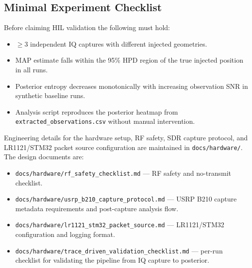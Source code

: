 \subsection{Minimal Experiment Checklist}
Before claiming HIL validation the following must hold:
\begin{itemize}
  \setlength\itemsep{0em}
  \item $\ge 3$ independent IQ captures with different injected geometries.
  \item MAP estimate falls within the 95\% HPD region of the true injected
        position in all runs.
  \item Posterior entropy decreases monotonically with increasing observation
        SNR in synthetic baseline runs.
  \item Analysis script reproduces the posterior heatmap from
        \texttt{extracted\_observations.csv} without manual intervention.
\end{itemize}

Engineering details for the hardware setup, RF safety, SDR capture protocol,
and LR1121/STM32 packet source configuration are maintained in
\texttt{docs/hardware/}.  The design documents are:
\begin{itemize}
  \item \texttt{docs/hardware/rf\_safety\_checklist.md} --- RF safety and
        no-transmit checklist.
  \item \texttt{docs/hardware/usrp\_b210\_capture\_protocol.md} --- USRP B210
        capture metadata requirements and post-capture analysis flow.
  \item \texttt{docs/hardware/lr1121\_stm32\_packet\_source.md} --- LR1121/STM32
        configuration and logging format.
  \item \texttt{docs/hardware/trace\_driven\_validation\_checklist.md} --- per-run
        checklist for validating the pipeline from IQ capture to posterior.
\end{itemize}